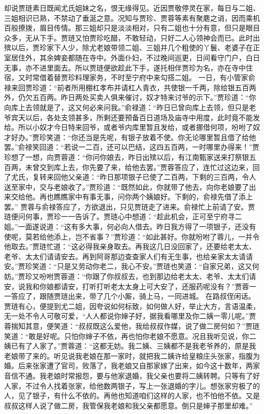 \documentclass[12pt,oneside]{book}
\begin{document}
却说贾琏素日既闻尤氏姐妹之名，恨无缘得见。近因贾敬停灵在家，每日与二姐、三姐相识已熟，不禁动了垂涎之意。况知与贾珍、贾蓉等素有聚麀之诮，因而乘机百般撩拨，眉目传情。那三姐却只是淡淡相对，只有二姐也十分有意，但只是眼目众多，无从下手。贾琏又怕贾珍吃醋，不敢轻动，只好二人心领神会而已。此时出殡以后，贾珍家下人少，除尤老娘带领二姐、三姐并几个粗使的丫鬟、老婆子在正室居住外，其余婢妾都随在寺中。外面仆妇，不过晚间巡更，日间看守门户，白日无事，亦不进里面去。所以贾琏便欲趁此下手，遂托相伴贾珍为名，亦在寺中住宿，又时常借着替贾珍料理家务，不时至宁府中来勾搭二姐。
一日，有小管家俞禄来回贾珍道：“前者所用棚杠孝布并请杠人青衣，共使银一千两，除给银五百两外，仍欠五百两。昨日两处买卖人俱来催讨，奴才特来讨爷的示下。”贾珍道：“你向库上去领就是了，这又何必来问我。”俞禄道：“昨日已曾向库上去领，但只是老爷宾天以后，各处支领甚多，所剩还要预备百日道场及庙寺中用度，此时竟不能发给。所以小奴才今日特来回爷，或者爷内库里暂且发给，或者挪借何项，吩咐了奴才好办。”贾珍笑道：“你还当是先呢，有银子放着不使。你无论哪里暂且借了给他罢。”俞禄笑回道：“若说一二百，还可以巴结，这四五百两，一时哪里办得来！”贾珍想了一想，向贾蓉道：“你问你娘去，昨日出殡以后，有江南甄家送来打祭银五百两，未曾交到库上去，你先要了来，给他去罢。”贾蓉答应了，连忙过这边来，回了尤氏，复转来回他父亲道：“昨日那项银子已使了二百两，下剩的三百两，令人送至家中，交与老娘收了。”贾珍道：“既然如此，你就带了他去，向你老娘要了出来交给他。再也瞧瞧家中有事无事，问你两个姨娘好。下剩的，俞禄先借了添上罢。”
贾蓉与俞禄答应了，方欲退出，只见贾琏走了进来。俞禄忙上前请了安。贾琏便问何事，贾珍一一告诉了。贾琏心中想道：“趁此机会，正可至宁府寻二姐。”一面遂说道：“这有多大事，何必向人借去。昨日我方得了一项银子，还没有使呢，莫若给他添上，岂不省事？”贾珍道：“如此甚好。你就吩咐了蓉儿，一并令他取去。”贾琏忙道：“这必得我亲身取去。再我这几日没回家了，还要给老太太、老爷、太太们请请安去。再到阿哥那边查查家人们有无生事，也给亲家太太请请安。”贾珍笑道：“只是又劳动你老二，我心不安。”贾琏也笑道：“自家兄弟，这又何妨。”贾珍又吩咐贾蓉道：“你跟了你叔叔去，也到那边给老太太、老爷、太太们请安，说我和你娘都请安，打听打听老太太身上可大安了，还服药呢没有？”贾蓉一一答应了，跟随贾琏出来，带了几个小厮，骑上马，一同进城。
在路叔侄闲话。贾琏有心，便提到尤二姐，因夸说如何标致，如何做人好，举止大方，言语温柔，无一处不令人可敬可爱，“人人都说你婶子好，据我看哪里及你二姨一零儿呢。”贾蓉揣知其意，便笑道：“叔叔既这么爱他，我给叔叔作媒，说了做二房何如？”贾琏笑道：“敢是好呢。只怕你婶子不依，再也怕你老娘不愿意。况且我听见说，你二姨已有了人家了。”贾蓉道：“这都无妨。我二姨、三姨都不是我老爷养的，原是我老娘带了来的。听见说我老娘在那一家时，就把我二姨许给皇粮庄头张家，指腹为婚。后来张家遭了官司，败落了，我老娘又自那家嫁了出来，如今这十数年，两家音信不通。我老娘时常报怨，要与他家退婚，我父亲也要将二姨转聘。只等有了好人家，不过令人找着张家，给他数两银子，写上一张退婚的字儿。想张家穷极了的人，见了银子，有什么不依的。再他也知道咱们这样的人家，也不怕他不依。又是叔叔这样人说了做二房，我管保我老娘和我父亲都愿意。倒只是婶子那里却难。”
\end{document}
